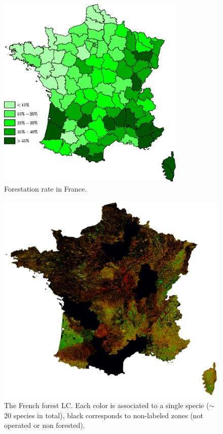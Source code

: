 \begin{figure}
\begin{center}
\includegraphics[width=0.8\textwidth]{Figures/boisement}
\end{center}
\caption{Forestation rate in France.}
\label{fig:forestation}
\end{figure}

\begin{figure}[htbp]
\begin{center}
\includegraphics[width=\textwidth]{Figures/BD_foret_France_2}
\end{center}
\caption{The French forest LC. Each color is associated to a single specie ($\sim$20 species in total), black corresponds to non-labeled zones (not operated or non forested).}
\label{fig:FLC}
\end{figure}


